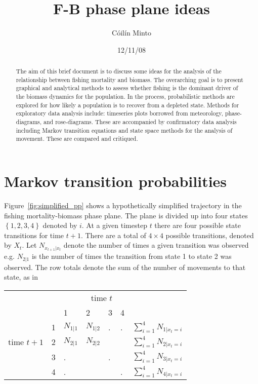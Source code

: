 \documentclass[a4paper,12pt]{article}
\author{C\'oil\'in Minto}
\title{F-B phase plane ideas}
\date{12/11/08}
\begin{document}
\maketitle
\begin{abstract}
The aim of this brief document is to discuss some ideas for the analysis of the relationship between fishing mortality and biomass. The overarching goal is to present graphical and analytical methods to assess whether fishing is the dominant driver of the biomass dynamics for the population. In the process, probabilistic methods are explored for how likely a population is to recover from a depleted state. Methods for exploratory data analysis include: timeseries plots borrowed from meteorology, phase-diagrams, and rose-diagrams. These are accompanied by confirmatory data analysis including Markov transition equations and state space methods for the analysis of movement. These are compared and critiqued.
\end{abstract}
\section{Markov transition probabilities}
Figure~\ref{fig:simplified_pp} shows a hypothetically simplified trajectory in the fishing mortality-biomass phase plane. The plane is divided up into four states $\left\{ {1, 2, 3, 4} \right\}$ denoted by $i$. At a given timestep $t$ there are four possible state transitions for time $t+1$. There are  a total of $4\times 4$ possible transitions, denoted by $X_t$. Let $N_{x_{t+1}|x_{t}}$ denote the number of times a given transition was observed e.g. $N_{2|1}$ is the number of times the transition from state 1 to state 2 was observed. The row totals  denote the sum of the number of movements to that state, as in \\

\hspace{.5in} \begin{tabular}{p{2cm} l | p{1cm}  p{1cm}  p{1cm}  p{1cm} r}
& \multicolumn{4}{r}{time $t$} \\
  &  & 1 & 2 & 3 & 4 & \\
\cline{2-6}
& 1 & $N_{1|1}$  & $N_{1|2}$  &  . & . & {\footnotesize $\displaystyle{\sum_{i=1}^4} N_{1|x_{t}=i}$ }\\
time $t+1$ & 2 &  $N_{2|1}$ & $N_{2|2}$ &  &   & {\footnotesize $\displaystyle{\sum_{i=1}^4} N_{2|x_{t}=i}$} \\
 & 3 & .  &   & .  &  & {\footnotesize $\displaystyle{\sum_{i=1}^4} N_{3|x_{t}=i}$}\\
 & 4 &  . &   &   & .& {\footnotesize $\displaystyle{\sum_{i=1}^4} N_{4|x_{t}=i}$}
\end{tabular}\\
\end{document}
